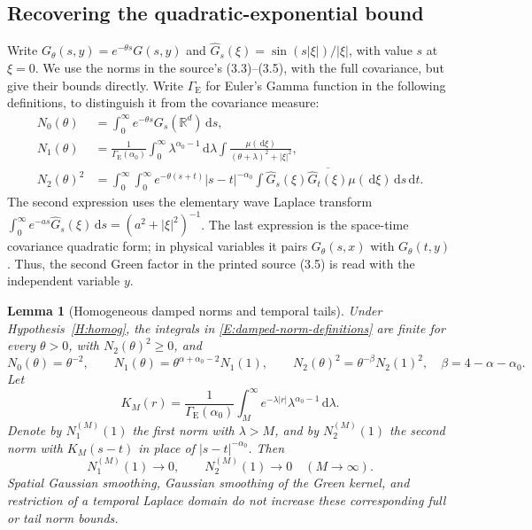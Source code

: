 \documentclass[12pt]{article}
\numberwithin{equation}{section}
\newtheorem{lemma}[theorem]{Lemma}
\theoremstyle{definition}
\newcommand{\R}{\mathbb{R}}
\newcommand{\ud}{\,\mathrm{d}}
\begin{document}
\subsection{Recovering the quadratic-exponential bound}

Write $G_\theta(s,y)=e^{-\theta s}G(s,y)$ and
$\widehat G_s(\xi)=\sin(s|\xi|)/|\xi|$, with value $s$ at $\xi=0$.
We use the norms in the source's (3.3)--(3.5), with the full covariance,
but give their bounds directly. Write $\Gamma_{\mathrm E}$ for Euler's
Gamma function in the following definitions, to distinguish it from the
covariance measure:
\begin{equation}\label{E:damped-norm-definitions}
  \begin{split}
    N_0(\theta)&=\int_0^\infty e^{-\theta s}G_s(\R^d)\ud s,\\
    N_1(\theta)&=\frac1{\Gamma_{\mathrm E}(\alpha_0)}
    \int_0^\infty\lambda^{\alpha_0-1}\ud\lambda
    \int\frac{\mu(\ud\xi)}{(\theta+\lambda)^2+|\xi|^2},\\
    N_2(\theta)^2&=\int_0^\infty\int_0^\infty
    e^{-\theta(s+t)}|s-t|^{-\alpha_0}
    \int\widehat G_s(\xi)\overline{\widehat G_t(\xi)}
    \mu(\ud\xi)\ud s\ud t.
  \end{split}
\end{equation}
The second expression uses the elementary wave Laplace transform
$\int_0^\infty e^{-as}\widehat G_s(\xi)\ud s=(a^2+|\xi|^2)^{-1}$.
The last expression is the space-time covariance quadratic form;
in physical variables it pairs $G_\theta(s,x)$ with $G_\theta(t,y)$.
Thus, the second Green factor in the printed source (3.5) is read with
the independent variable $y$.

\begin{lemma}[Homogeneous damped norms and temporal tails]
  \label{L:damped-homogeneous-norms}
  Under Hypothesis~\ref{H:homog}, the integrals in
  \eqref{E:damped-norm-definitions} are finite for every $\theta>0$,
  with $N_2(\theta)^2\ge0$, and
  \[
    N_0(\theta)=\theta^{-2},\qquad
    N_1(\theta)=\theta^{\alpha+\alpha_0-2}N_1(1),\qquad
    N_2(\theta)^2=\theta^{-\beta}N_2(1)^2,
    \quad\beta=4-\alpha-\alpha_0.
  \]
  Let
  \[
    K_M(r)=\frac1{\Gamma_{\mathrm E}(\alpha_0)}
    \int_M^\infty e^{-\lambda|r|}\lambda^{\alpha_0-1}\ud\lambda.
  \]
  Denote by $N_1^{(M)}(1)$ the first norm with $\lambda>M$, and by
  $N_2^{(M)}(1)$ the second norm with $K_M(s-t)$ in place of
  $|s-t|^{-\alpha_0}$. Then
  \begin{equation}\label{E:damped-tail-norms}
    N_1^{(M)}(1)\longrightarrow0,\qquad
    N_2^{(M)}(1)\longrightarrow0\quad(M\to\infty).
  \end{equation}
  Spatial Gaussian smoothing, Gaussian smoothing of the Green kernel,
  and restriction of a temporal Laplace domain do not increase these
  corresponding full or tail norm bounds.
\end{lemma}
\end{document}
